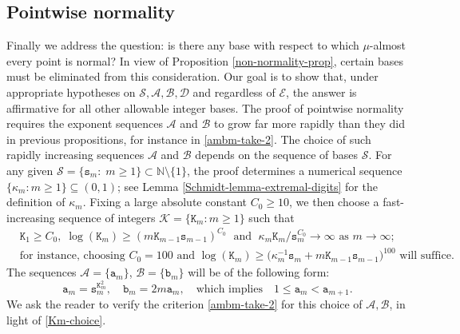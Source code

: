 \documentclass[12pt, twoside]{article}
\theoremstyle{definition}
\numberwithin{equation}{section}
\begin{document}
\subsection{Pointwise normality} \label{normality-statement-section} 
Finally we address the question: is there any base with respect to which $\mu$-almost every point is normal? In view of Proposition \ref{non-normality-prop}, certain bases must be eliminated from this consideration. Our goal is to show that, under appropriate hypotheses on $\mathcal S, \mathcal A, \mathcal B, \mathcal D$ and regardless of $\mathcal E$, the answer is affirmative for all other allowable integer bases. 
\vskip0.1in 
\noindent The proof of pointwise normality requires the exponent sequences $\mathcal A$ and $\mathcal B$ to grow far more rapidly than they did in previous propositions, for instance in \eqref{ambm-take-2}. The choice of such rapidly increasing sequences $\mathcal A$ and $\mathcal B$ depends on the sequence of bases $\mathcal{S}$.
For any given $\mathcal{S}=\{\mathtt s_m:\; m\geq 1\} \subset \mathbb N \setminus \{1\}$, the proof determines a numerical sequence $\{\kappa_m : m \geq 1\} \subseteq (0, 1)$; see Lemma \ref{Schmidt-lemma-extremal-digits} for the definition of $\kappa_m$. 
Fixing a large absolute constant $C_0 \geq 10$, we then choose a fast-increasing sequence of integers $\mathcal K = \{\mathtt K_m : m \geq 1\}$ such that 
\begin{align} 
& \mathtt K_1 \geq C_0, \; \log(\mathtt K_m) \geq (m \mathtt K_{m-1} \mathtt s_{m-1})^{C_0} \; \text{ and } \; \kappa_m \mathtt K_m/\mathtt s_m^{C_0} \rightarrow \infty \text{ as } m \rightarrow \infty;\label{Km-choice} \\  
&\text{for instance, choosing } C_0 = 100 \text{ and } \log(\mathtt K_m) \geq \bigl( \kappa_m^{-1} \mathtt s_m + m \mathtt K_{m-1} \mathtt s_{m-1} \bigr)^{100} \text{ will suffice.} \nonumber 
\end{align}  
The sequences $\mathcal A = \{\mathtt a_m\}$, $\mathcal B = \{\mathtt b_m\}$ will be of the following form: 
\begin{equation} \label{normality-hypotheses}
\mathtt a_m = \mathtt s_m^{\mathtt K_m^2}, \quad \mathtt b_m = 2m\mathtt a_m, \quad
\text{which implies} \quad 1 \leq \mathtt a_m < \mathtt a_{m+1}. 
\end{equation}   
We ask the reader to verify the criterion \eqref{ambm-take-2} for this choice of $\mathcal A, \mathcal B$, in light of \eqref{Km-choice}. 
\end{document}
